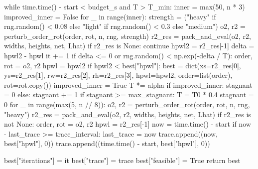 \documentclass{JXUSTmodeling}
\begin{document}
\begin{appendixx}
\begin{python}
    while time.time() - start < budget_s and T > T_min:
        inner = max(50, n * 3)
        improved_inner = False
        for _ in range(inner):
            strength = ("heavy" if rng.random() < 0.08 else
                        "light" if rng.random() < 0.3 else "medium")
            o2, r2 = perturb_order_rot(order, rot, n, rng, strength)
            r2_res = pack_and_eval(o2, r2, widths, heights, net, Lhat)
            if r2_res is None:
                continue
            hpwl2 = r2_res[-1]
            delta = hpwl2 - hpwl
            it += 1
            if delta <= 0 or rng.random() < np.exp(-delta / T):
                order, rot = o2, r2
                hpwl = hpwl2
                if hpwl2 < best["hpwl"]:
                    best = dict(xs=r2_res[0], ys=r2_res[1], rw=r2_res[2],
                                rh=r2_res[3], hpwl=hpwl2,
                                order=list(order), rot=rot.copy())
                    improved_inner = True
        T *= alpha
        if improved_inner:
            stagnant = 0
        else:
            stagnant += 1
        if stagnant >= max_stagnant:
            T = T0 * 0.4
            stagnant = 0
            for _ in range(max(5, n // 8)):
                o2, r2 = perturb_order_rot(order, rot, n, rng, "heavy")
                r2_res = pack_and_eval(o2, r2, widths, heights, net, Lhat)
                if r2_res is not None:
                    order, rot = o2, r2
                    hpwl = r2_res[-1]
        now = time.time() - start
        if now - last_trace >= trace_interval:
            last_trace = now
            trace.append((now, best["hpwl"], 0))
    trace.append((time.time() - start, best["hpwl"], 0))

    best["iterations"] = it
    best["trace"] = trace
    best["feasible"] = True
    return best
  \end{python}
\end{appendixx}
\end{document}
